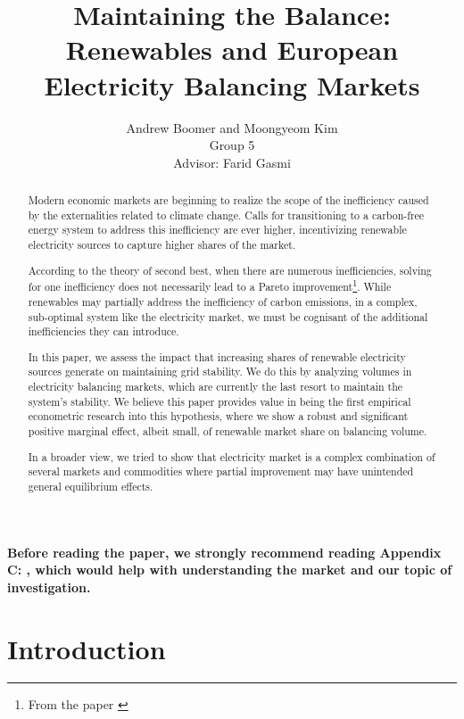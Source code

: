 \documentclass[12pt]{article}
\title {Maintaining the Balance: Renewables and
European Electricity Balancing Markets}
\author{Andrew Boomer and Moongyeom Kim\\
Group 5\\
Advisor: Farid Gasmi
}
\begin{document}
\maketitle
\hspace{5cm}
\tableofcontents

\newpage
\begin{abstract}
\doublespacing
Modern economic markets are beginning to realize the scope of the inefficiency caused by the externalities related to climate change. Calls for transitioning to a carbon-free energy system to address this inefficiency are ever higher, incentivizing renewable electricity sources to capture higher shares of the market.\par

According to the theory of second best, when there are numerous inefficiencies, solving for one inefficiency does not necessarily lead to a Pareto improvement\footnote{From the paper \citet{lipsey1956general}}. While renewables may partially address the inefficiency of carbon emissions, in a complex, sub-optimal system like the electricity market, we must be cognisant of the additional inefficiencies they can introduce.\par

In this paper, we assess the impact that increasing shares of renewable electricity sources generate on maintaining grid stability. We do this by analyzing volumes in electricity balancing markets, which are currently the last resort to maintain the system's stability. We believe this paper provides value in being the first empirical econometric research into this hypothesis, where we show a robust and significant positive marginal effect, albeit small, of renewable market share on balancing volume.\par

In a broader view, we tried to show that electricity market is a complex combination of several markets and commodities where partial improvement may have unintended general equilibrium effects.

\end{abstract}

\newpage
\doublespacing
{} \textbf{Before reading the paper, we strongly recommend reading Appendix C: , which would help with understanding the market and our topic of investigation.} 

\section{Introduction}
\label{section:Introduction}
\end{document}

